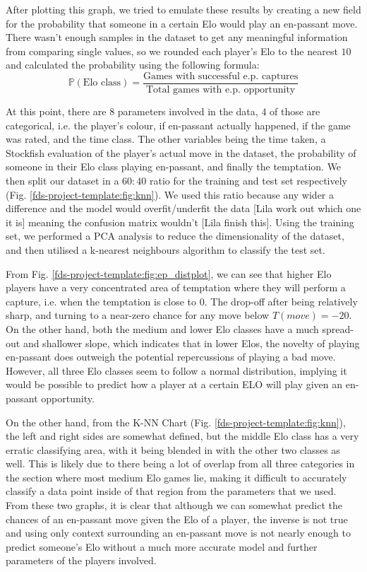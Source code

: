\documentclass[10pt,a4paper]{article}
\begin{document}
\begin{multicols}{2}
After plotting this graph, we tried to emulate these results by creating a new field for the probability that someone in a certain Elo would play an en-passant move. There wasn't enough samples in the dataset to get any meaningful information from comparing single values, so we rounded each player's Elo to the nearest $10$ and calculated the probability using the following formula:
$$\mathbb{P}(\text{Elo class}) = \frac{\text{Games with successful e.p. captures}}{\text{Total games with e.p. opportunity}}$$

At this point, there are $8$ parameters involved in the data, $4$ of those are categorical, i.e. the player's colour, if en-passant actually happened, if the game was rated, and the time class. The other variables being the time taken, a Stockfish evaluation of the player's actual move in the dataset, the probability of someone in their Elo class playing en-passant, and finally the temptation. We then split our dataset in a $60:40$ ratio for the training and test set respectively (Fig. \ref{fds-project-template:fig:knn}). We used this ratio because any wider a difference and the model would overfit/underfit the data [Lila work out which one it is] meaning the confusion matrix wouldn't [Lila finish this]. Using the training set, we performed a PCA analysis to reduce the dimensionality of the dataset, and then utilised a k-nearest neighbours algorithm to classify the test set.\newline

From Fig. \ref{fds-project-template:fig:ep_distplot}, we can see that higher Elo players have a very concentrated area of temptation where they will perform a capture, i.e. when the temptation is close to $0$. The drop-off after being relatively sharp, and turning to a near-zero chance for any move below $T(move)=-20$. On the other hand, both the medium and lower Elo classes have a much spread-out and shallower slope, which indicates that in lower Elos, the novelty of playing en-passant does outweigh the potential repercussions of playing a bad move. However, all three Elo classes seem to follow a normal distribution, implying it would be possible to predict how a player at a certain ELO will play given an en-passant opportunity.\newline

On the other hand, from the K-NN Chart (Fig. \ref{fds-project-template:fig:knn}), the left and right sides are somewhat defined, but the middle Elo class has a very erratic classifying area, with it being blended in with the other two classes as well. This is likely due to there being a lot of overlap from all three categories in the section where most medium Elo games lie, making it difficult to accurately classify a data point inside of that region from the parameters that we used. From these two graphs, it is clear that although we can somewhat predict the chances of an en-passant move given the Elo of a player, the inverse is not true and using only context surrounding an en-passant move is not nearly enough to predict someone's Elo without a much more accurate model and further parameters of the players involved. \newline


\end{multicols}
\end{document}
